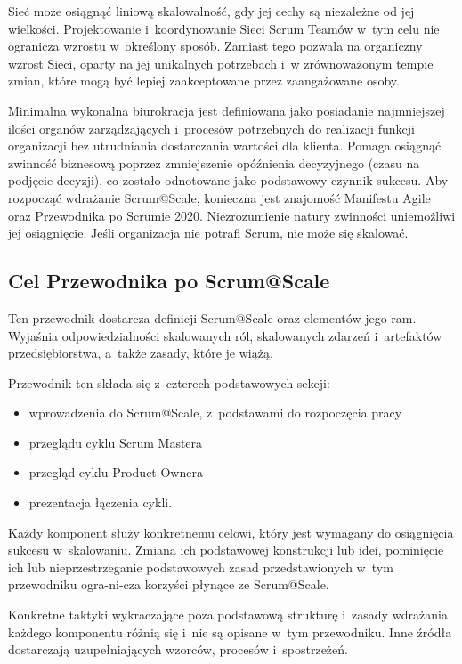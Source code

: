 \documentclass[12pt,a4paper,parskip=full]{scrartcl}
\begin{document}
Sieć może osiągnąć liniową skalowalność, gdy jej cechy są niezależne od jej wielkości. Projektowanie i~koordynowanie Sieci Scrum Teamów w~tym celu nie ogranicza wzrostu w~określony sposób. Zamiast tego pozwala na organiczny wzrost Sieci, oparty na jej unikalnych potrzebach i~w zrównoważonym tempie zmian, które mogą być lepiej zaakceptowane przez zaangażowane osoby.

Minimalna wykonalna biurokracja jest definiowana jako posiadanie najmniejszej ilości organów zarządzających i~procesów potrzebnych do realizacji funkcji organizacji bez utrudniania dostarczania wartości dla klienta. Pomaga osiągnąć zwinność biznesową poprzez zmniejszenie opóźnienia decyzyjnego (czasu na podjęcie decyzji), co zostało odnotowane jako podstawowy czynnik sukcesu. Aby rozpocząć wdrażanie Scrum@Scale, konieczna jest znajomość Manifestu Agile oraz Przewodnika po Scrumie 2020. Niezrozumienie natury zwinności uniemożliwi jej osiągnięcie. Jeśli organizacja nie potrafi Scrum, nie może się skalować.


\subsection{Cel Przewodnika po Scrum@Scale}\label{purpose-of-the-ScrumatScale-guide}

Ten przewodnik dostarcza definicji Scrum@Scale oraz elementów jego ram. Wyjaśnia odpowiedzialności skalowanych ról, skalowanych zdarzeń i~artefaktów przed\-się\-bior\-stwa, a~także zasady, które je wiążą.

Przewodnik ten składa się z~czterech podstawowych sekcji:

\begin{itemize}
\itemsep1pt\parskip0pt
\item
  wprowadzenia do Scrum@Scale, z~podstawami do rozpoczęcia pracy
\item
  przeglądu cyklu Scrum Mastera
\item
  przegląd cyklu Product Ownera
\item
  prezentacja łączenia cykli.
\end{itemize}

Każdy komponent służy konkretnemu celowi, który jest wymagany do osiągnięcia sukcesu w~skalowaniu. Zmiana ich podstawowej konstrukcji lub idei, pominięcie ich lub nieprzestrzeganie podstawowych zasad przedstawionych w~tym przewodniku ogra-ni-cza korzyści płynące ze Scrum@Scale.

Konkretne taktyki wykraczające poza podstawową strukturę i~zasady wdrażania każ\-de\-go komponentu różnią się i~nie są opisane w~tym przewodniku. Inne źródła dostarczają uzupełniających wzorców, procesów i~spostrzeżeń.
\end{document}
